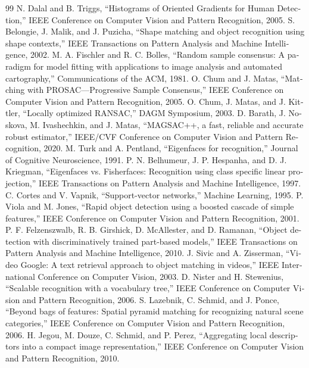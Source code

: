 \documentclass[12pt,openany,oneside]{book}
\begin{document}
\begin{latin}
\begin{thebibliography}{99}
 N. Dalal and B. Triggs, ``Histograms of Oriented Gradients for Human Detection,'' IEEE Conference on Computer Vision and Pattern Recognition, 2005.
 S. Belongie, J. Malik, and J. Puzicha, ``Shape matching and object recognition using shape contexts,'' IEEE Transactions on Pattern Analysis and Machine Intelligence, 2002.
 M. A. Fischler and R. C. Bolles, ``Random sample consensus: A paradigm for model fitting with applications to image analysis and automated cartography,'' Communications of the ACM, 1981.
 O. Chum and J. Matas, ``Matching with PROSAC—Progressive Sample Consensus,'' IEEE Conference on Computer Vision and Pattern Recognition, 2005.
 O. Chum, J. Matas, and J. Kittler, ``Locally optimized RANSAC,'' DAGM Symposium, 2003.
 D. Barath, J. Noskova, M. Ivashechkin, and J. Matas, ``MAGSAC++, a fast, reliable and accurate robust estimator,'' IEEE/CVF Conference on Computer Vision and Pattern Recognition, 2020.
 M. Turk and A. Pentland, ``Eigenfaces for recognition,'' Journal of Cognitive Neuroscience, 1991.
 P. N. Belhumeur, J. P. Hespanha, and D. J. Kriegman, ``Eigenfaces vs. Fisherfaces: Recognition using class specific linear projection,'' IEEE Transactions on Pattern Analysis and Machine Intelligence, 1997.
 C. Cortes and V. Vapnik, ``Support-vector networks,'' Machine Learning, 1995.
 P. Viola and M. Jones, ``Rapid object detection using a boosted cascade of simple features,'' IEEE Conference on Computer Vision and Pattern Recognition, 2001.
 P. F. Felzenszwalb, R. B. Girshick, D. McAllester, and D. Ramanan, ``Object detection with discriminatively trained part-based models,'' IEEE Transactions on Pattern Analysis and Machine Intelligence, 2010.
 J. Sivic and A. Zisserman, ``Video Google: A text retrieval approach to object matching in videos,'' IEEE International Conference on Computer Vision, 2003.
 D. Nister and H. Stewenius, ``Scalable recognition with a vocabulary tree,'' IEEE Conference on Computer Vision and Pattern Recognition, 2006.
 S. Lazebnik, C. Schmid, and J. Ponce, ``Beyond bags of features: Spatial pyramid matching for recognizing natural scene categories,'' IEEE Conference on Computer Vision and Pattern Recognition, 2006.
 H. Jegou, M. Douze, C. Schmid, and P. Perez, ``Aggregating local descriptors into a compact image representation,'' IEEE Conference on Computer Vision and Pattern Recognition, 2010.

\end{thebibliography}
\end{latin}
\end{document}
